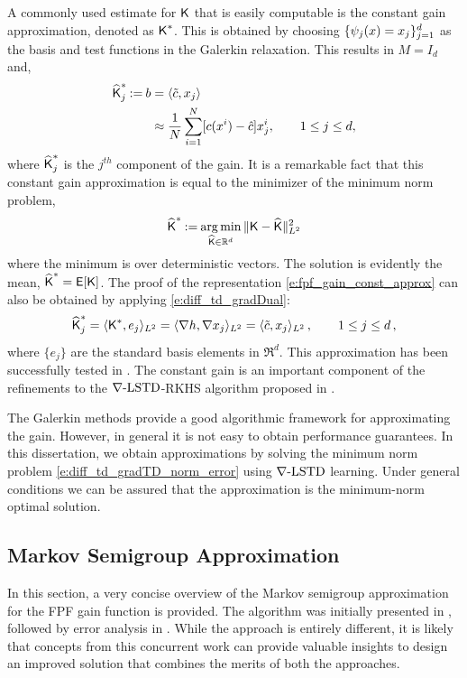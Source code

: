 A commonly used estimate for $\text{\sf K}$ that is easily computable is the constant gain approximation, denoted as $\text{\sf K}^*$. This is obtained by choosing $\{\psi_j(x) = x_j\}_{j=1}^d$ as the basis and test functions in the Galerkin relaxation. This results in  $M = I_{d}$ and,
\begin{align}
\hakFPF^*_j \eqdef b & = \langle \tilc , x_j \rangle \\ 
& \approx \frac{1}{N} \sum_{i=1}^N [ c(x^i) - \hac ]x^i_j, \qquad 1 \leq j \leq d,
\label{e:fpf_gain_const_approx}
\end{align}
where $\widehat{\text{\sf K}}^*_j$ is the $j^{th}$ component of the gain.
It is a remarkable fact that this constant gain approximation is equal to the minimizer of the minimum norm problem,  
  \begin{equation}
  \hakFPF^* \eqdef \argmin_{\hakFPF \in \Re^d} \| \kFPF - \hakFPF \|^2_{L^{2}}
  \label{e:fpf_const}
  \end{equation}
  where the minimum is over deterministic vectors. The solution is evidently the mean,  $\widehat{\text{\sf K}}^* = {\sf E}[\text{\sf K}]$.
The proof of the representation \eqref{e:fpf_gain_const_approx} can also be obtained by applying \eqref{e:diff_td_gradDual}: 
\[
\widehat{\text{\sf K}}^*_ j =  \langle \text{\sf K}^* ,e_j \rangle_{L^2}
=
\langle \nabla h, \nabla x_j \rangle_{L^2} =
\langle \tilde c ,x_j \rangle_{L^2}\,, \qquad 1\le j\le d\,,
\]
where $\{e_j\}$ are the standard basis elements in $\Re^d$. This approximation has been successfully tested in \cite{tilghiomeh13}. The constant gain is an important component of the refinements to the $\nabla\text{-LSTD}$-RKHS algorithm proposed in .

The Galerkin methods provide a good algorithmic framework for approximating the gain. However, in general it is not easy to obtain performance guarantees. In this dissertation, we obtain approximations by solving  the minimum norm problem \eqref{e:diff_td_gradTD_norm_error} using $\nabla\text{-LSTD}$ learning.  Under general conditions we can be assured that the approximation is the minimum-norm optimal solution.   

\subsection{Markov Semigroup Approximation}
\label{s:coifman}
In this section, a very concise overview of the Markov semigroup approximation for the FPF gain function is provided. The algorithm was initially presented in \cite{tagmeh16}, followed by error analysis in \cite{tagmehmey17}. While the approach is entirely different, it is likely that concepts from this concurrent work can provide valuable insights to design an improved solution that combines the merits of both the approaches. 

